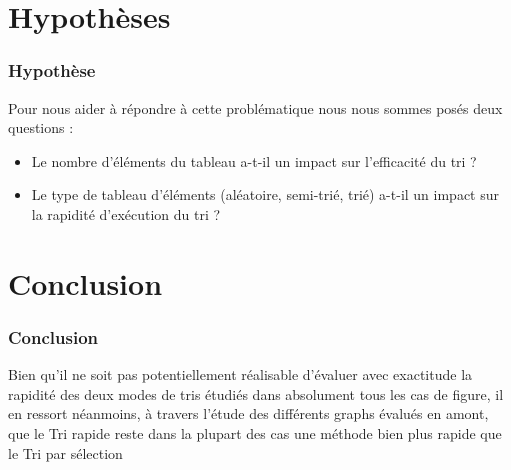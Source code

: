\documentclass[12pt,french]{beamer}
\begin{document}
\section{Hypothèses}
\begin{frame}
\frametitle{Hypothèse}
Pour nous aider à répondre à cette problématique nous nous sommes posés deux questions :
\pause
\begin{itemize}[<+->]
\item Le nombre d’éléments du tableau a-t-il un impact sur l’efficacité du tri ?\\
\item Le type de tableau d’éléments (aléatoire, semi-trié, trié) a-t-il un impact sur la rapidité d’exécution du tri ?  
\end{itemize}
\end{frame}
\section{Conclusion}
\begin{frame}
\frametitle{Conclusion}
Bien qu’il ne soit pas potentiellement réalisable d’évaluer avec exactitude la rapidité des deux modes de tris étudiés dans absolument tous les cas de figure, il en ressort néanmoins, à travers l’étude des différents graphs évalués en amont, que le Tri rapide reste dans la plupart des cas une méthode bien plus rapide que le Tri par sélection  \\
\end{frame}
\end{document}
